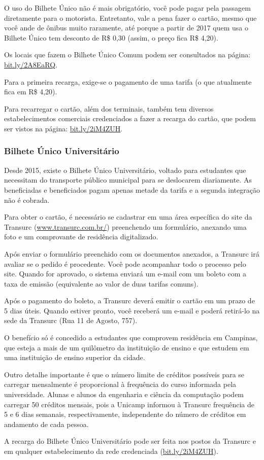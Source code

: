 O uso do Bilhete Único não é mais obrigatório, você pode pagar pela passagem
diretamente para o motorista. Entretanto, vale a pena fazer o cartão, mesmo
que você ande de ônibus muito raramente, até porque a partir de 2017 quem
usa o Bilhete Único tem desconto de R\$ 0,30 (assim, o preço fica R\$ 4,20).

Os locais que fazem o Bilhete Único Comum podem ser consultados na página:
\url{bit.ly/2A8EaRQ}.

Para a primeira recarga, exige-se o pagamento de uma tarifa (o que atualmente
fica em R\$ 4,20).

Para recarregar o cartão, além dos terminais, também tem diversos
estabelecimentos comerciais credenciados a fazer a recarga do cartão, que podem
ser vistos na página: \url{bit.ly/2iM4ZUH}.

\subsubsection{Bilhete Único Universitário}

Desde 2015, existe o Bilhete Único Universitário, voltado para estudantes que
necessitam do transporte público municipal para se deslocarem diariamente. As
beneficiadas e beneficiados pagam apenas metade da tarifa e a segunda
integração não é cobrada.

Para obter o cartão, é necessário se cadastrar em uma área específica do site
da Transurc (\url{www.transurc.com.br/}) preenchendo um formulário, anexando
uma foto e um comprovante de residência digitalizado.

Após enviar o formulário preenchido com os documentos anexados, a Transurc
irá avaliar se o pedido é procedente. Você pode acompanhar todo o processo pelo
site. Quando for aprovado, o sistema enviará um e-mail com um boleto com a taxa
de emissão (equivalente ao valor de duas tarifas comuns).

Após o pagamento do boleto, a Transurc deverá emitir o cartão em um prazo de
5 dias úteis. Quando estiver pronto, você receberá um e-mail e poderá retirá-lo
na sede da Transurc (Rua 11 de Agosto, 757).

O benefício só é concedido a estudantes que comprovem residência em Campinas,
que esteja a mais de um quilômetro da instituição de ensino e que estudem em
uma instituição de ensino superior da cidade.

Outro detalhe importante é que o número limite de créditos possíveis para se
carregar mensalmente é proporcional à frequência do curso informada pela
universidade. Alunas e alunos da engenharia e ciência da computação podem
carregar 50 créditos mensais, pois a Unicamp informou à Transurc frequência de
5 e 6 dias semanais, respectivamente, independente do número de créditos em
andamento de cada pessoa.

A recarga do Bilhete Único Universitário pode ser feita nos postos da Transurc
e em qualquer estabelecimento da rede credenciada (\url{bit.ly/2iM4ZUH}).
